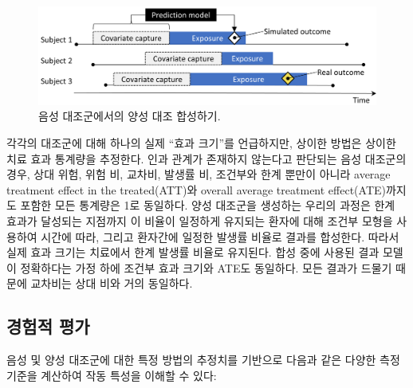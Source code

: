 \documentclass[11pt]{book}
\theoremstyle{definition}
\theoremstyle{definition}
\theoremstyle{definition}
\theoremstyle{remark}
\begin{document}
\begin{figure}

{\centering \includegraphics[width=0.9\linewidth]{images/MethodValidity/posControlSynth} 

}

\caption{음성 대조군에서의 양성 대조 합성하기.}\label{fig:posControlSynth}
\end{figure}

각각의 대조군에 대해 하나의 실제 ``효과 크기''를 언급하지만, 상이한
방법은 상이한 치료 효과 통계량을 추정한다. 인과 관계가 존재하지 않는다고
판단되는 음성 대조군의 경우, 상대 위험, 위험 비, 교차비, 발생률 비,
조건부와 한계 뿐만이 아니라 average treatment effect in the
treated(ATT)와 overall average treatment effect(ATE)까지도 포함한 모든
통계량은 1로 동일하다. 양성 대조군을 생성하는 우리의 과정은 한계 효과가
달성되는 지점까지 이 비율이 일정하게 유지되는 환자에 대해 조건부 모형을
사용하여 시간에 따라, 그리고 환자간에 일정한 발생률 비율로 결과를
합성한다. 따라서 실제 효과 크기는 치료에서 한계 발생률 비율로 유지된다.
합성 중에 사용된 결과 모델이 정확하다는 가정 하에 조건부 효과 크기와
ATE도 동일하다. 모든 결과가 드물기 때문에 교차비는 상대 비와 거의
동일하다.

\subsection{경험적 평가}\label{metrics}


음성 및 양성 대조군에 대한 특정 방법의 추정치를 기반으로 다음과 같은
다양한 측정 기준을 계산하여 작동 특성을 이해할 수 있다:
\end{document}
